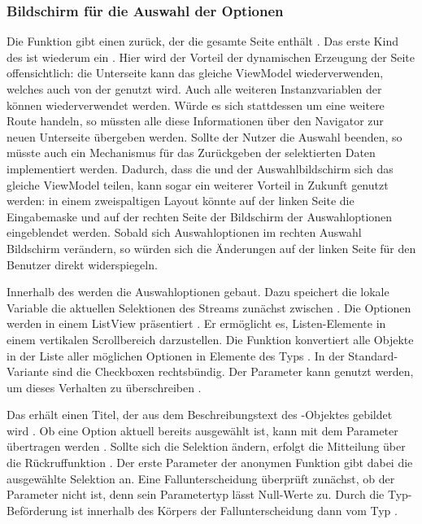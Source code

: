 \subsubsection{Bildschirm für die Auswahl der Optionen}

 
Die Funktion  \Lst{\ref{lst:Schritt1FunktionCreateMultipleChoiceSelectionScreen}} gibt einen  zurück, der die gesamte Seite enthält .
Das erste Kind des  ist wiederum ein  .
Hier wird der Vorteil der dynamischen Erzeugung der Seite offensichtlich: die Unterseite kann das gleiche ViewModel wiederverwenden, welches auch von der  genutzt wird.  Auch alle weiteren Instanzvariablen der  können wiederverwendet werden. Würde es sich stattdessen um eine weitere Route handeln, so müssten alle diese Informationen über den Navigator zur neuen Unterseite übergeben werden. Sollte der Nutzer die Auswahl beenden, so müsste auch ein Mechanismus für das Zurückgeben der selektierten Daten implementiert werden.
Dadurch, dass die  und der Auswahlbildschirm sich das gleiche ViewModel teilen, kann sogar ein weiterer Vorteil in Zukunft genutzt werden: in einem zweispaltigen Layout könnte auf der linken Seite die Eingabemaske und auf der rechten Seite der Bildschirm der Auswahloptionen eingeblendet werden.
Sobald sich Auswahloptionen im rechten Auswahl Bildschirm verändern, so würden sich die Änderungen auf der linken Seite für den Benutzer direkt widerspiegeln.

Innerhalb des  werden die Auswahloptionen gebaut.
Dazu speichert die lokale Variable  die aktuellen Selektionen des Streams zunächst zwischen .
Die Optionen werden in einem ListView präsentiert .
Er ermöglicht es, Listen-Elemente in einem vertikalen Scrollbereich darzustellen.
Die Funktion  konvertiert alle Objekte in der Liste aller möglichen Optionen  in Elemente des Typs  .
In der Standard-Variante sind die Checkboxen rechtsbündig.
Der Parameter  kann genutzt werden, um dieses Verhalten zu überschreiben . 

Das  erhält einen Titel, der aus dem Beschreibungstext  des -Objektes gebildet wird .
Ob eine Option aktuell bereits ausgewählt ist, kann mit dem Parameter  übertragen werden .
Sollte sich die Selektion ändern, erfolgt die Mitteilung über die Rückruffunktion  .
Der erste Parameter der anonymen Funktion gibt dabei die ausgewählte Selektion an.
Eine Fallunterscheidung überprüft zunächst, ob der Parameter  nicht  ist, denn sein Parametertyp  lässt Null-Werte zu.
Durch die Typ-Beförderung ist  innerhalb des Körpers der Fallunterscheidung dann vom Typ  . 


